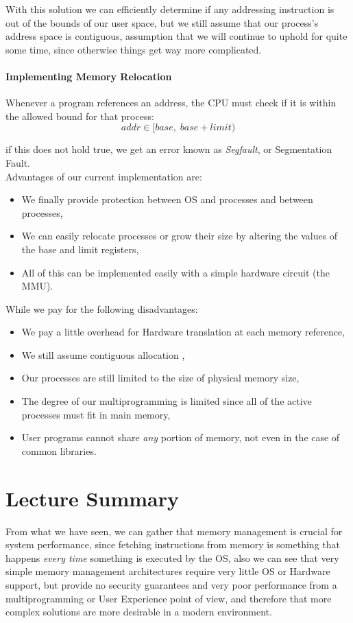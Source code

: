 \documentclass[openright, twoside]{report}
\theoremstyle{definition}
\theoremstyle{example}
\begin{document}
		With this solution we can efficiently determine if any addressing instruction is out of the bounds of our user space, but we still 
		assume that our process's address space is contiguous, assumption that we will continue to uphold for quite some time, since otherwise 
		things get way more complicated.

		\paragraph{Implementing Memory Relocation}
		Whenever a program references an address, the CPU must check if it is within the allowed bound for that process:
		\[
			addr \in [base, \; base + limit)
		\]

		if this does not hold true, we get an error known as \emph{Segfault}, or Segmentation Fault.\\

		Advantages of our current implementation are:
		\begin{itemize}
			\item We finally provide protection between OS and processes and between processes,
			\item We can easily relocate processes or grow their size by altering the values of the base and limit registers,
			\item All of this can be implemented easily with a simple hardware circuit (the MMU).
		\end{itemize}
		While we pay for the following disadvantages:
		\begin{itemize}
			\item We pay a little overhead for Hardware translation at each memory reference,
			\item We still assume contiguous allocation ,
			\item Our processes are still limited to the size of physical memory size,
			\item The degree of our multiprogramming is limited since all of the active processes must fit in main memory, 
			\item User programs cannot share \emph{any} portion of memory, not even in the case of common libraries. 
		\end{itemize}

	\section{Lecture Summary}
	From what we have seen, we can gather that memory management is crucial for system performance, since fetching instructions from 
	memory is something that happens \emph{every time} something is executed by the OS, also we can see that very simple memory management 
	architectures require very little OS or Hardware support, but provide no security guarantees and very poor performance from a 
	multiprogramming or User Experience point of view, and therefore that more complex solutions are more desirable in a modern environment.
\end{document}
